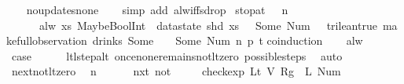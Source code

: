 \begin{isabellebody}
%
\isadelimproof
\ \ %
\endisadelimproof
%
\isatagproof
{}\isamarkupfalse%
\ no{\isacharunderscore}updates{\isacharunderscore}none\isanewline
\ \ \isamarkupfalse%
\ {\isacharparenleft}simp\ add{\isacharcolon}\ alw{\isacharunderscore}iff{\isacharunderscore}sdrop{\isacharparenright}%
\endisatagproof
{\isafoldproof}%
%
\isadelimproof
\isanewline
%
\endisadelimproof
\isanewline
{}\isamarkupfalse%
\ stop{\isacharunderscore}at{\isacharunderscore}{}{\isacharcolon}\ {\isachardoublequoteopen}{}\ {\isasymle}\ n\ {\isasymLongrightarrow}\isanewline
\ \ \ \ \ \ alw\ {\isacharparenleft}{\isasymlambda}xs{\isachardot}\ MaybeBoolInt\ {\isacharparenleft}{\isacharless}{\isacharparenright}\ {\isacharparenleft}datastate\ {\isacharparenleft}shd\ xs{\isacharparenright}\ {\isachardollar}\ {}{\isacharparenright}\ {\isacharparenleft}Some\ {\isacharparenleft}Num\ {}{\isacharparenright}{\isacharparenright}\ {\isasymnoteq}\ trilean{\isachardot}true{\isacharparenright}\ {\isacharparenleft}make{\isacharunderscore}full{\isacharunderscore}observation\ drinks\ {\isacharparenleft}Some\ {}{\isacharparenright}\ {\isacharless}{}\ {\isachardollar}{\isacharcolon}{\isacharequal}\ Some\ {\isacharparenleft}Num\ n{\isacharparenright}{\isachargreater}\ p\ t{\isacharparenright}{\isachardoublequoteclose}\isanewline
%
\isadelimproof
%
\endisadelimproof
%
\isatagproof
{}\isamarkupfalse%
{\isacharparenleft}coinduction{\isacharparenright}\isanewline
\ \ \isamarkupfalse%
\ alw\isanewline
\ \ \isamarkupfalse%
\ \isamarkupfalse%
\ {\isacharquery}case\isanewline
\ \ \ \ \isamarkupfalse%
\ ltl{\isacharunderscore}step{\isacharunderscore}alt\ once{\isacharunderscore}none{\isacharunderscore}remains{\isacharunderscore}not{\isacharunderscore}lt{\isacharunderscore}zero\ possible{\isacharunderscore}steps{\isacharunderscore}{}\ \isamarkupfalse%
\ auto\isanewline
{}\isamarkupfalse%
%
\endisatagproof
{\isafoldproof}%
%
\isadelimproof
\isanewline
%
\endisadelimproof
\isanewline
{}\isamarkupfalse%
\ next{\isacharunderscore}not{\isacharunderscore}lt{\isacharunderscore}zero{\isacharcolon}\isanewline
\ \ {\isachardoublequoteopen}n\ {\isasymge}\ {}\ {\isasymLongrightarrow}\isanewline
\ \ \ {\isacharparenleft}nxt\ {\isacharparenleft}not\ \isanewline
\ \ \ \ {\isacharparenleft}check{\isacharunderscore}exp\ {\isacharparenleft}Lt\ {\isacharparenleft}V\ {\isacharparenleft}Rg\ {}{\isacharparenright}{\isacharparenright}\ {\isacharparenleft}L\ {\isacharparenleft}Num\ {}{\isacharparenright}{\isacharparenright}{\isacharparenright}{\isacharparenright}\isanewline

\end{isabellebody}
